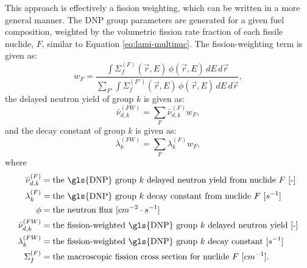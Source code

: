 This approach is effectively a fission weighting, which can be written in a more general manner. 
The \gls{DNP} group parameters are generated for a given fuel composition, weighted by the volumetric fission rate fraction of each fissile nuclide, $F$, similar to Equation \eqref{eq:lami-multinuc}.
The fission-weighting term is given as:
\begin{equation}
w_F = \frac{\displaystyle \int \Sigma_f^{(F)}(\vec{r},E) \, \phi(\vec{r},E) \, dE \, d\vec{r}}
           {\displaystyle \sum_{F'} \int \Sigma_f^{(F')}(\vec{r},E) \, \phi(\vec{r},E) \, dE \, d\vec{r}},
\label{eq:fission-weight}
\end{equation}
the delayed neutron yield of group $k$ is given as:
\begin{equation}
\bar{\nu}_{d,k}^{(FW)} = \sum_F \bar{\nu}_{d,k}^{(F)}  w_F,
\label{eq:nubar-fw}
\end{equation}
and the decay constant of group $k$ is given as:
\begin{equation}
    \lambda_{k}^{(FW)} = \sum_F \lambda^{(F)}_{k}  w_F,
    \label{eq:decayconst-fw}
\end{equation}
where
\begin{align}
    \bar{\nu}^{(F)}_{d, k} &= \text{the \gls{DNP} group $k$ delayed neutron yield from nuclide $F$ [-]} \nonumber \\
    \lambda^{(F)}_{k} &= \text{the \gls{DNP} group $k$ decay constant from nuclide $F$ $[s^{-1}]$} \nonumber \\
    \phi &= \text{the neutron flux $[cm^{-2} \cdot s^{-1}]$} \nonumber \\ 
    \bar{\nu}^{(FW)}_{d, k} &= \text{the fission-weighted \gls{DNP} group $k$ delayed neutron yield [-]} \nonumber \\
    \lambda^{(FW)}_{k} &= \text{the fission-weighted \gls{DNP} group $k$ decay constant $[s^{-1}]$} \nonumber\\
    \Sigma_f^{(F)} &= \text{the macroscopic fission cross section for nuclide $F$ $[cm^{-1}]$}. \nonumber
\end{align}

